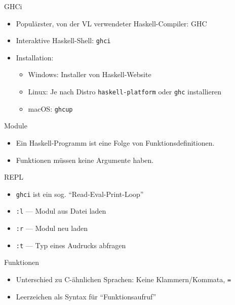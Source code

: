 \documentclass{beamer}
\begin{document}
\begin{frame}[fragile]{GHCi}

	\begin{itemize}
		\item Populärster, von der VL verwendeter Haskell-Compiler: GHC
		\item Interaktive Haskell-Shell: \texttt{ghci}
		\item Installation:
		\begin{itemize}
			\item Windows: Installer von Haskell-Website
			\item Linux: Je nach Distro \texttt{haskell-platform} oder \texttt{ghc} installieren
			\item macOS: \texttt{ghcup}
		\end{itemize}
	\end{itemize}
\end{frame}

\begin{frame}{Module}

	\begin{itemize}
		\item Ein Haskell-Programm ist eine Folge von Funktionsdefinitionen.
		\item Funktionen müssen keine Argumente haben.
	\end{itemize}
\end{frame}

\begin{frame}{REPL}

	\begin{itemize}
		\item \texttt{ghci} ist ein sog. \enquote{Read-Eval-Print-Loop}
                \item \texttt{:l} --- Modul aus Datei laden
                \item \texttt{:r} --- Modul neu laden
		\item \texttt{:t} --- Typ eines Audrucks abfragen
	\end{itemize}
\end{frame}

\begin{frame}{Funktionen}

	\begin{itemize}
		\item Unterschied zu C-ähnlichen Sprachen: Keine Klammern/Kommata, \texttt{=}
                \item Leerzeichen als Syntax für \enquote{Funktionsaufruf}
	\end{itemize}
\end{frame}
\end{document}

